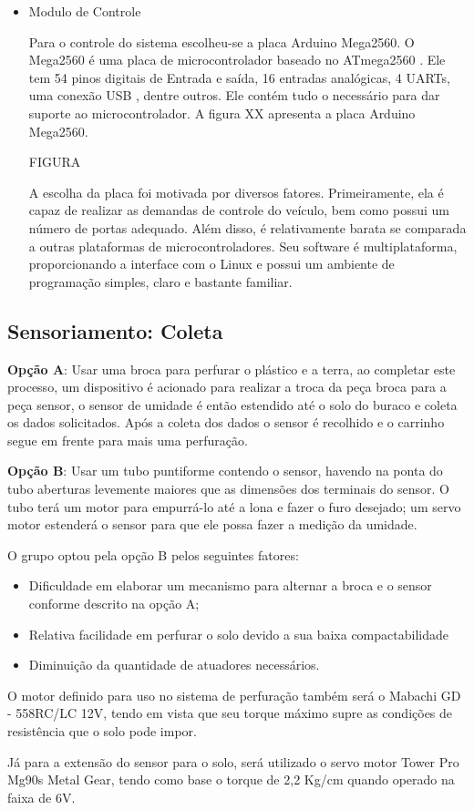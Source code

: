 \begin{itemize}
  \item Modulo de Controle

  Para o controle do sistema escolheu-se a placa Arduino Mega2560.
  O Mega2560 é uma placa de microcontrolador baseado no ATmega2560 .
  Ele tem 54 pinos digitais de Entrada e saída, 16 entradas analógicas,
  4 UARTs, uma conexão USB , dentre outros. Ele contém tudo o necessário
  para dar suporte ao microcontrolador. A figura XX apresenta a placa
  Arduino Mega2560.

FIGURA

A escolha da placa foi motivada por diversos fatores.
Primeiramente, ela é capaz de realizar as demandas de controle do
veículo, bem como possui um número de portas adequado. Além disso,
é relativamente barata se comparada a outras plataformas de
microcontroladores. Seu software é multiplataforma, proporcionando
a interface com o Linux e possui um ambiente de programação simples,
claro e bastante familiar.


  \end{itemize}



  \subsection{Sensoriamento: Coleta}

  \textbf{Opção A}: Usar uma broca para perfurar o plástico e a terra, ao completar este
  processo, um dispositivo é acionado para realizar a troca da peça broca para
  a peça sensor, o sensor de umidade é então estendido até o solo do buraco e
  coleta os dados solicitados. Após a coleta dos dados o sensor é recolhido e o
  carrinho segue em frente para mais uma perfuração.

  \textbf{Opção B}: Usar um tubo puntiforme contendo o sensor, havendo na ponta do tubo
  aberturas levemente maiores que as dimensões dos terminais do sensor. O tubo
  terá um motor para empurrá-lo até a lona e fazer o furo desejado; um servo
  motor estenderá o sensor para que ele possa fazer a medição da umidade.

  O grupo optou pela opção B pelos seguintes fatores:

  \begin{itemize}
    \item Dificuldade em elaborar um mecanismo para alternar a broca e o sensor
    conforme descrito na opção A;
    \item Relativa facilidade em perfurar o solo devido a sua baixa compactabilidade
    \item Diminuição da quantidade de atuadores necessários.
  \end{itemize}

  O motor definido para uso no sistema de perfuração também será o
  Mabachi GD - 558RC/LC 12V, tendo em vista que seu torque máximo supre as
  condições de resistência que o solo pode impor.

  Já para a extensão do sensor para o solo, será utilizado o servo motor Tower
  Pro Mg90s Metal Gear, tendo como base o torque de 2,2 Kg/cm quando operado na faixa de 6V.

